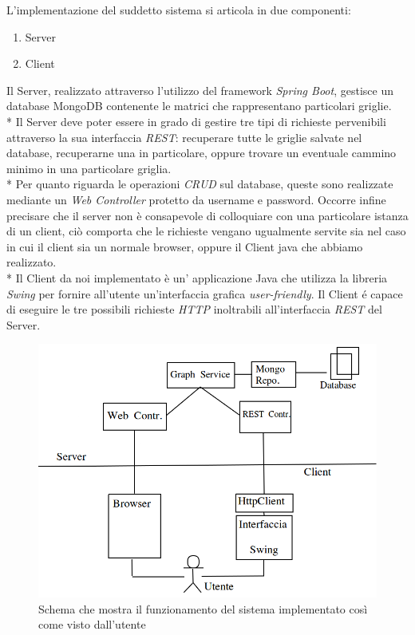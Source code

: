 \newpage
L'implementazione del suddetto sistema si articola in due componenti:
\begin{enumerate}
	\item Server
	\item Client
\end{enumerate}
Il Server, realizzato attraverso l'utilizzo del framework \emph{Spring Boot}, gestisce un database MongoDB contenente le matrici che rappresentano particolari griglie.\\*
Il Server deve poter essere in grado di gestire tre tipi di richieste pervenibili attraverso la sua interfaccia \emph{REST}: recuperare tutte le griglie salvate nel database, recuperarne una in particolare, oppure trovare un eventuale cammino minimo in una particolare griglia.\\*
Per quanto riguarda le operazioni \emph{CRUD} sul database, queste sono realizzate mediante un \emph{Web Controller} protetto da username e password. Occorre infine precisare che il server non \`e consapevole di colloquiare con una particolare istanza di un client, ci\`o comporta che le richieste vengano ugualmente servite sia nel caso in cui il client sia un normale browser, oppure il Client java che abbiamo realizzato.\\*
Il Client da noi implementato \`e un' applicazione Java che utilizza la libreria \emph{Swing} per fornire all'utente un'interfaccia grafica \emph{user-friendly}. Il Client \'e capace di eseguire le tre possibili richieste \emph{HTTP} inoltrabili all'interfaccia \emph{REST} del Server.
\begin{figure}[th]
	\centering
	\includegraphics[width=0.7\linewidth]{Images/app-scheme}
	\caption[Schema UML-Like]{Schema che mostra il funzionamento del sistema implementato cos\`i come visto dall'utente}
	\label{fig:app-scheme}
\end{figure}

